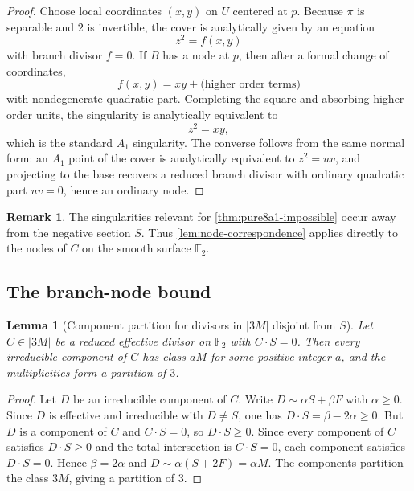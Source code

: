\documentclass[11pt]{article}
\newtheorem{lemma}[lemma]{Lemma}
\theoremstyle{definition}
\newtheorem{remark}[remark]{Remark}
\begin{document}
\begin{proof}
Choose local coordinates $(x,y)$ on $U$ centered at $p$. Because $\pi$ is separable and $2$ is invertible, the cover is analytically given by an equation
\[
z^2=f(x,y)
\]
with branch divisor $f=0$. If $B$ has a node at $p$, then after a formal change of coordinates,
\[
f(x,y)=xy+\text{(higher order terms)}
\]
with nondegenerate quadratic part. Completing the square and absorbing higher-order units, the singularity is analytically equivalent to
\[
z^2=xy,
\]
which is the standard $A_1$ singularity. The converse follows from the same normal form: an $A_1$ point of the cover is analytically equivalent to $z^2=uv$, and projecting to the base recovers a reduced branch divisor with ordinary quadratic part $uv=0$, hence an ordinary node.
\end{proof}

\begin{remark}
The singularities relevant for \cref{thm:pure8a1-impossible} occur away from the negative section $S$. Thus \cref{lem:node-correspondence} applies directly to the nodes of $C$ on the smooth surface $\mathbb F_2$.
\end{remark}

\subsection{The branch-node bound}

\begin{lemma}[Component partition for divisors in $|3M|$ disjoint from $S$]\label{lem:component-partition}
Let $C\in |3M|$ be a reduced effective divisor on $\mathbb F_2$ with $C\cdot S=0$. Then every irreducible component of $C$ has class $aM$ for some positive integer $a$, and the multiplicities form a partition of $3$.
\end{lemma}

\begin{proof}
Let $D$ be an irreducible component of $C$. Write $D\sim \alpha S+\beta F$ with $\alpha\ge 0$. Since $D$ is effective and irreducible with $D\ne S$, one has $D\cdot S=\beta-2\alpha\ge 0$. But $D$ is a component of $C$ and $C\cdot S=0$, so $D\cdot S\ge 0$. Since every component of $C$ satisfies $D\cdot S\ge 0$ and the total intersection is $C\cdot S=0$, each component satisfies $D\cdot S=0$. Hence $\beta=2\alpha$ and $D\sim \alpha(S+2F)=\alpha M$. The components partition the class $3M$, giving a partition of $3$.
\end{proof}
\end{document}
